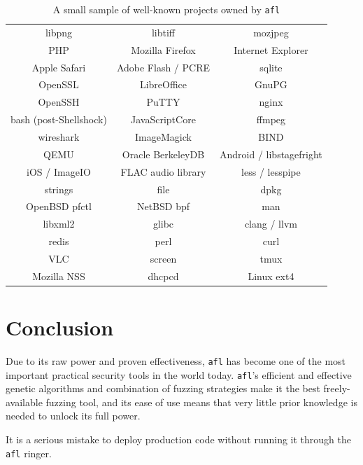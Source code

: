 \begin{table}[H]
\centering
\begin{tabular}{c | c | c}
libpng & libtiff & mozjpeg \\
PHP & Mozilla Firefox & Internet Explorer \\
Apple Safari & Adobe Flash / PCRE & sqlite \\
OpenSSL & LibreOffice & GnuPG \\
OpenSSH & PuTTY & nginx \\
bash (post-Shellshock) & JavaScriptCore & ffmpeg \\
wireshark & ImageMagick & BIND \\
QEMU & Oracle BerkeleyDB & Android / libstagefright \\
iOS / ImageIO & FLAC audio library & less / lesspipe \\
strings & file & dpkg \\
OpenBSD pfctl & NetBSD bpf & man \\
libxml2 & glibc & clang / llvm \\
redis & perl & curl \\
VLC & screen & tmux  \\
Mozilla NSS & dhcpcd & Linux ext4 \\
\end{tabular}
\caption{A small sample of well-known projects owned by \texttt{afl}}
\label{fig:afl-trophies}
\end{table}

\section{Conclusion}

Due to its raw power and proven effectiveness, \texttt{afl} has become one of
the most important practical security tools in the world today. \texttt{afl}'s
efficient and effective genetic algorithms and combination of fuzzing
strategies make it the best freely-available fuzzing tool, and its ease
of use means that very little prior knowledge is needed to unlock its full
power.

It is a serious mistake to deploy production code without running it through
the \texttt{afl} ringer.
